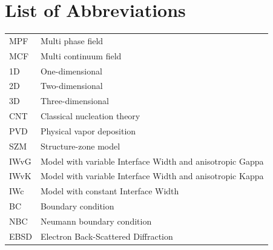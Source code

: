 \chapter{List of Abbreviations}

\begin{longtable}{ll}
	MPF & Multi phase field \\
	MCF & Multi continuum field \\
	1D & One-dimensional \\
	2D & Two-dimensional \\
	3D & Three-dimensional \\
	CNT & Classical nucleation theory \\
	PVD & Physical vapor deposition \\
	SZM & Structure-zone model \\
	IWvG & Model with variable Interface Width and anisotropic Gappa  \\
	IWvK & Model with variable Interface Width and anisotropic Kappa \\
	IWc & Model with constant Interface Width  \\
	BC & Boundary condition \\
	NBC & Neumann boundary condition \\
	EBSD & Electron Back-Scattered Diffraction \\
\end{longtable}


%
%
%
%




\cleardoublepage

